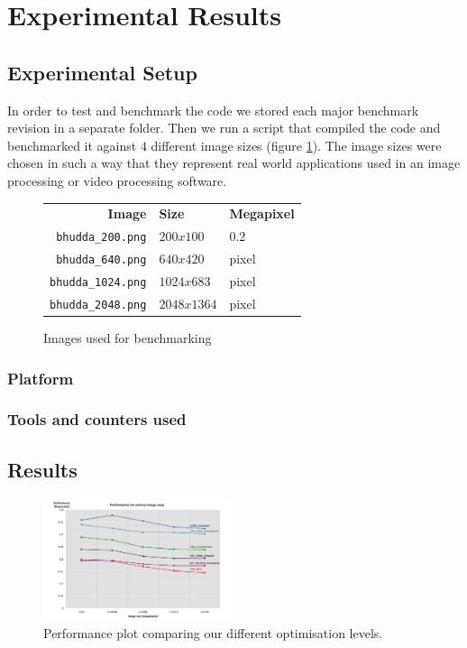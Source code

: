 \section{Experimental Results}\label{sec:exp}
\subsection{Experimental Setup}\label{sec:exp_setup8}
In order to test and benchmark the code we stored each major benchmark revision in a separate folder. Then we run a script that compiled the code and benchmarked it against $4$ different image sizes (figure \ref{tab:images}). The image sizes were chosen in such a way that they represent real world applications used in an image processing or video processing software.
\begin{figure}
\centering
\begin{tabular}{rll}
\textbf{Image} & \textbf{Size}  &\textbf{Megapixel}\\
\texttt{bhudda\_200.png} & $200x100$ & $0.2$\\
\texttt{bhudda\_640.png} & $640x420$ & pixel\\
\texttt{bhudda\_1024.png} & $1024x683$ & pixel\\
\texttt{bhudda\_2048.png} & $2048x1364$ & pixel\\
\end{tabular}
\caption{Images used for benchmarking}
\label{tab:images}
\end{figure}

\subsubsection{Platform}

\subsubsection{Tools and counters used}
\subsection{Results}

\setlength\fboxsep{0pt}
\setlength\fboxrule{0.5pt}
 
\begin{figure}\vspace{-1mm}
  \includegraphics[trim=10mm 0mm 10mm 0mm, clip, width=0.49\textwidth]{figures/performance}
  \caption{Performance plot comparing our different optimisation levels.\label{performance}}
\end{figure}
 

